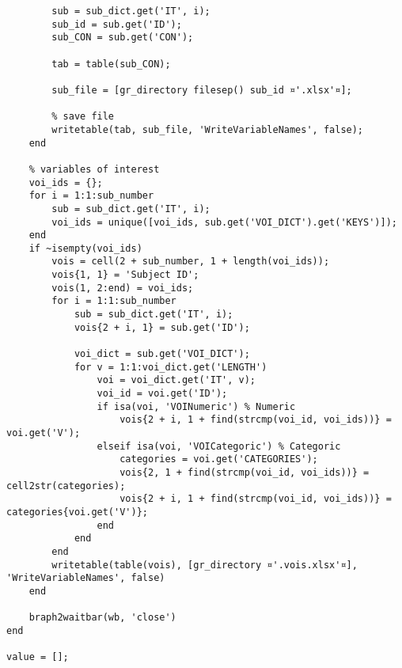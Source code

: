 \documentclass{tufte-handout}
\begin{document}
\begin{lstlisting}
        sub = sub_dict.get('IT', i);
        sub_id = sub.get('ID');
        sub_CON = sub.get('CON');
        
        tab = table(sub_CON);

        sub_file = [gr_directory filesep() sub_id ¤'.xlsx'¤];

        % save file
        writetable(tab, sub_file, 'WriteVariableNames', false);
    end
    
    % variables of interest
    voi_ids = {};
    for i = 1:1:sub_number
        sub = sub_dict.get('IT', i);
        voi_ids = unique([voi_ids, sub.get('VOI_DICT').get('KEYS')]);
    end
    if ~isempty(voi_ids)
        vois = cell(2 + sub_number, 1 + length(voi_ids));
        vois{1, 1} = 'Subject ID';
        vois(1, 2:end) = voi_ids;
        for i = 1:1:sub_number
            sub = sub_dict.get('IT', i);
            vois{2 + i, 1} = sub.get('ID');
            
            voi_dict = sub.get('VOI_DICT');
            for v = 1:1:voi_dict.get('LENGTH')
                voi = voi_dict.get('IT', v);
                voi_id = voi.get('ID');
                if isa(voi, 'VOINumeric') % Numeric
                    vois{2 + i, 1 + find(strcmp(voi_id, voi_ids))} = voi.get('V');
                elseif isa(voi, 'VOICategoric') % Categoric
                    categories = voi.get('CATEGORIES');
                    vois{2, 1 + find(strcmp(voi_id, voi_ids))} = cell2str(categories);
                    vois{2 + i, 1 + find(strcmp(voi_id, voi_ids))} = categories{voi.get('V')};
                end
            end
        end
        writetable(table(vois), [gr_directory ¤'.vois.xlsx'¤], 'WriteVariableNames', false)
    end

    braph2waitbar(wb, 'close')
end

value = [];
\end{lstlisting}
\end{document}
